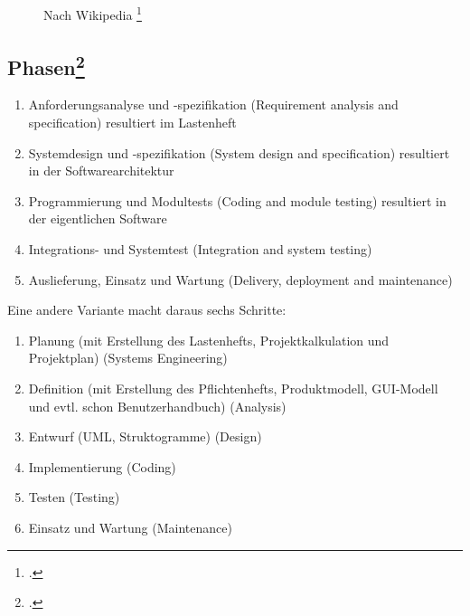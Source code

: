 \documentclass{lehramt-informatik}
\begin{document}
\begin{figure}
\caption{Nach Wikipedia \footcite{wiki:wasserfallmodell}}
\end{figure}

\subsection{Phasen\footcite{wiki:wasserfallmodell}}

\begin{enumerate}
\item Anforderungsanalyse und -spezifikation
(Requirement analysis and specification)
resultiert im Lastenheft

\item Systemdesign und -spezifikation
(System design and specification)
resultiert in der Softwarearchitektur

\item Programmierung und Modultests
(Coding and module testing)
resultiert in der eigentlichen Software

\item Integrations- und Systemtest
(Integration and system testing)

\item Auslieferung, Einsatz und Wartung
(Delivery, deployment and maintenance)
\end{enumerate}

\noindent
Eine andere Variante macht daraus sechs Schritte:

\begin{enumerate}
\item Planung
(mit Erstellung des Lastenhefts, Projektkalkulation und Projektplan)
(Systems Engineering)

\item Definition
(mit Erstellung des Pflichtenhefts, Produktmodell, GUI-Modell und evtl.
schon Benutzerhandbuch)
(Analysis)

\item Entwurf
(UML, Struktogramme)
(Design)

\item Implementierung
(Coding)

\item Testen
(Testing)

\item Einsatz und Wartung
(Maintenance)
\end{enumerate}
\end{document}
